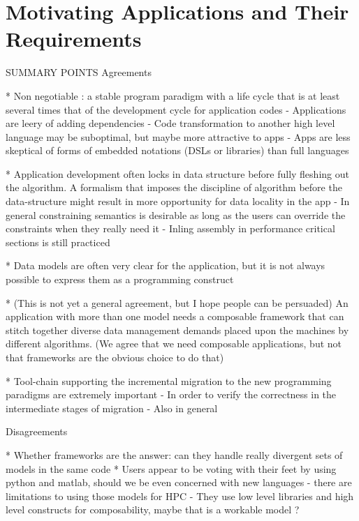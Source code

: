\chapter{Motivating Applications and Their Requirements}
\label{ch:apps}



SUMMARY POINTS
Agreements

* Non negotiable : a stable program paradigm with a life cycle that is
   at least several times that of the development cycle for
   application codes
   - Applications are leery of adding dependencies
   - Code transformation to another high level language may be
      suboptimal, but maybe more attractive to apps
   - Apps are less skeptical of forms of embedded notations (DSLs or
   libraries) than full languages

* Application development often locks in data structure before fully
   fleshing out the algorithm. A formalism that imposes the discipline
   of algorithm before the data-structure might result in more
   opportunity for data locality in the app
   - In general constraining semantics is desirable as long as the
      users can override the constraints when they really need it
   - Inling assembly in performance critical sections is still
      practiced
 
* Data models are often very clear for the application, but it is not
  always possible to express them as a programming construct

* (This is not yet a general agreement, but I hope people can be
   persuaded) An application with more than one model needs a
   composable framework that can stitch together diverse data
   management demands placed upon the machines by different
   algorithms. (We agree that we need composable applications, but not
   that frameworks are the obvious choice to do that)

* Tool-chain supporting the incremental migration to the new
  programming paradigms are extremely important 
  - In order to verify the correctness in the intermediate stages of
     migration  
  - Also in general 


Disagreements

* Whether frameworks are the answer: can they handle really divergent
  sets of models in the same code
* Users appear to be voting with their feet by using python and
  matlab, should we be even concerned with new languages
  - there are limitations to using those models for HPC
  - They use low level libraries and high level constructs for
     composability, maybe that is a workable model ?

